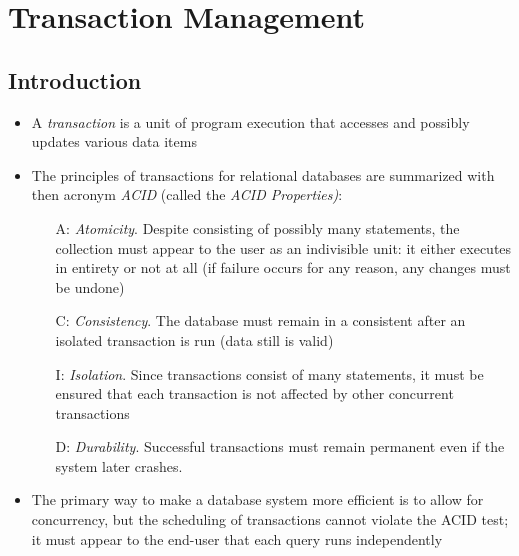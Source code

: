 \documentclass[a4paper]{article}
\begin{document}
\section{Transaction Management}
\subsection{Introduction}
\begin{itemize}
    \item A \emph{transaction} is a unit of program execution that accesses and possibly updates various data items
    \item The principles of transactions for relational databases are summarized with then acronym \emph{ACID} (called the \emph{ACID Properties)}:
    \begin{itemize}
        \item[A:] \emph{Atomicity}. Despite consisting of possibly many statements, the collection must appear to the user as an indivisible unit: it either executes in entirety or not at all (if failure occurs for any reason, any changes must be undone)
        \item[C:] \emph{Consistency}. The database must remain in a consistent after an isolated transaction is run (data still is valid)
        \item[I:] \emph{Isolation}. Since transactions consist of many statements, it must be ensured that each transaction is not affected by other concurrent transactions
        \item[D:] \emph{Durability}. Successful transactions must remain permanent even if the system later crashes.
    \end{itemize}
    \item The primary way to make a database system more efficient is to allow for concurrency, but the scheduling of transactions cannot violate the ACID test; it must appear to the end-user that each query runs independently
\end{itemize}
\end{document}
